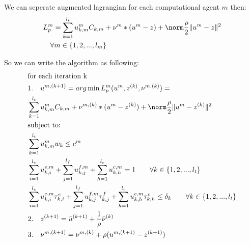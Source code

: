 \documentclass[conference]{IEEEtran}
\begin{document}
    We can seperate augmented lagrangian for each computational agent $m$ then:
    \begin{subequations}
      \begin{align}
        &L_p^m = \sum_{k=1}^{l_t} u_{k,m}^{m} C_{k,m}
        + \nu^m*(u^m-z) + \norm\frac{\rho}{2} \|u^m-z\|^2 \\ \notag
        &\quad \forall m\in\{1,2,...,l_m\}
      \end{align}
    \end{subequations}

    So we can write the algorithm as following:
    \begin{subequations}
      \begin{align}
        &\text{for each iteration k} \\ \notag
        &\text{1.\quad}u^{m,(k+1)} = arg \min {L_p^m(u^{m}, z^{(k)}, \nu^{m,(k)})} = \\ \notag
        &\sum_{k=1}^{l_t} u_{k,m}^{m} C_{k,m}
        + \nu^{m,(k)}*(u^m-z^{(k)}) + \norm\frac{\rho}{2} \|u^m-z^{(k)}\|^2 \\ \notag
        &\text{subject to:} \\ \notag
        &\sum_{k=1}^{l_t}{u_{k,m}^m w_k} \le c^m \\ \notag
        &\sum_{i=1}^{l_e}u_{k,i}^{e,m}+\sum_{j=1}^{l_f}u_{k,j}^{f,m}+\sum_{h=1}^{l_c}u_{k,h}^{c,m}=1 \quad\quad \forall k\in\{1,2,...,l_t\} \\ \notag
        &\sum_{i=1}^{l_e}u_{k,i}^{e,m}\tau_{k,i}^e
        +\sum_{j=1}^{l_f}u_{k,j}^{f,m}\tau_{k,j}^f
        +\sum_{h=1}^{l_c}u_{k,h}^{c,m}\tau_{k,h}^c
        \le \delta_k \quad\quad \forall k\in\{1,2,...,l_t\} \\ \notag
        &\text{2.\quad}{z}^{(k+1)} = \bar{u}^{(k+1)} + \frac{1}{\rho}\bar{\nu}^{(k)} \\ \notag
        &\text{3.\quad}{\nu}^{m,(k+1)} = \nu^{m,(k)} + \rho(u^{m,(k+1)} - z^{(k+1)})
      \end{align}
    \end{subequations}
\end{document}

